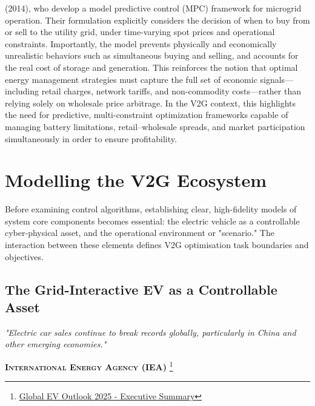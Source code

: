 (2014), who develop a model predictive control (MPC) framework for microgrid operation. Their formulation explicitly considers the decision of when to buy from or sell to the utility grid, under time-varying spot prices and operational constraints. Importantly, the model prevents physically and economically unrealistic behaviors such as simultaneous buying and selling, and accounts for the real cost of storage and generation. This reinforces the notion that optimal energy management strategies must capture the full set of economic signals—including retail charges, network tariffs, and non-commodity costs—rather than relying solely on wholesale price arbitrage. In the V2G context, this highlights the need for predictive, multi-constraint optimization frameworks capable of managing battery limitations, retail–wholesale spreads, and market participation simultaneously in order to ensure profitability.
\newpage
\section{Modelling the V2G Ecosystem}
\label{sec:ev_and_scenario}

Before examining control algorithms, establishing clear, high-fidelity models of system core components becomes essential: the electric vehicle as a controllable cyber-physical asset, and the operational environment or "scenario." The interaction between these elements defines V2G optimisation task boundaries and objectives.

\subsection{The Grid-Interactive EV as a Controllable Asset}

\begin{center}
  \begin{minipage}{0.85\textwidth}
    \begin{displayquote}
      \large\itshape
      "Electric car sales continue to break records globally, particularly in China and other emerging economies."\\[1em]

    \end{displayquote} 
    
  \end{minipage} 
\end{center}

\begin{flushright}
  \textsc{\textbf{International Energy Agency (IEA)}
\footnote{\href{https://www.iea.org/reports/global-ev-outlook-2025/executive-summary}{Global EV Outlook 2025 - Executive Summary}}}
\end{flushright}



